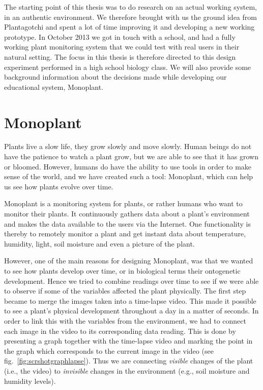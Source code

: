 The starting point of this thesis was to do research on an actual working system, in an authentic environment. We therefore brought with us the ground idea from Plantagotchi and spent a lot of time improving it and developing a new working prototype. In October 2013 we got in touch with a school, and had a fully working plant monitoring system that we could test with real users in their natural setting. The focus in this thesis is therefore directed to this design experiment performed in a high school biology class. We will also provide some background information about the decisions made while developing our educational system, Monoplant. 


\section{Monoplant}
Plants live a slow life, they grow slowly and move slowly. Human beings do not have the patience to watch a plant grow, but we are able to see that it has grown or bloomed. However, humans do have the ability to use tools in order to make sense of the world, and we have created such a tool: Monoplant, which can help us see how plants evolve over time.

Monoplant is a monitoring system for plants, or rather humans who want to monitor their plants. It continuously gathers data about a plant's environment and makes the data available to the users via the Internet. One functionality is thereby to remotely monitor a plant and get instant data about temperature, humidity, light, soil moisture and even a picture of the plant. 

However, one of the main reasons for designing Monoplant, was that we wanted to see how plants develop over time, or in biological terms their ontogenetic development. Hence we tried to combine readings over time to see if we were able to observe if some of the variables affected the plant physically. The first step became to merge the images taken into a time-lapse video. This made it possible to see a plant's physical development throughout a day in a matter of seconds. In order to link this with the variables from the environment, we had to connect each image in the video to its corresponding data reading. This is done by presenting a graph together with the time-lapse video and marking the point in the graph which corresponds to the current image in the video (see fig.~\ref{fig:scrshotgraphlapse}). Thus we are connecting \emph{visible} changes of the plant (i.e., the video) to \emph{invisible} changes in the environment (e.g., soil moisture and humidity levels).


